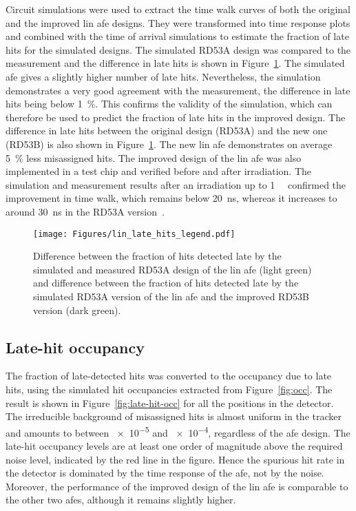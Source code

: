 Circuit simulations were used to extract the time walk curves of both the original and the improved \gls{lin} \gls{afe} designs. They were transformed into time response plots and combined with the time of arrival simulations to estimate the fraction of late hits for the simulated designs.
The simulated RD53A design was compared to the measurement and the difference in late hits is shown in Figure~\ref{fig:meas_vs_sim}. The simulated \gls{afe} gives a slightly higher number of late hits. Nevertheless, the simulation demonstrates a very good agreement with the measurement, the difference in late hits being below \SI{1}{\percent}. This confirms the validity of the simulation, which can therefore be used to predict the fraction of late hits in the improved design. The difference in late hits between the original design (RD53A) and the new one (RD53B) is also shown in Figure~\ref{fig:meas_vs_sim}. The new \gls{lin} \gls{afe} demonstrates on average \SI{5}{\percent} less misassigned hits. 
The improved design of the \gls{lin} \gls{afe} was also implemented in a test chip and verified before and after irradiation. The simulation and measurement results after an irradiation up to \SI{1}{\giga\rad} confirmed the improvement in time walk, which remains below \SI{20}{\nano\second}, whereas it increases to around \SI{30}{\nano\second} in the RD53A version~\citep{new_lin}.

\begin{figure}[t]
    \centering
    \texttt{[image: Figures/lin\_late\_hits\_legend.pdf]}
    \caption{Difference between the fraction of hits detected late by the simulated and measured RD53A design of the \gls{lin} \gls{afe} (light green) and difference between the fraction of hits detected late by the simulated RD53A version of the \gls{lin} \gls{afe} and the improved RD53B version (dark green). }
    \label{fig:meas_vs_sim}
\end{figure}

\subsection*{Late-hit occupancy}

The fraction of late-detected hits was converted to the occupancy due to late hits, using the simulated hit occupancies extracted from Figure~\ref{fig:occ}. The result is shown in Figure~\ref{fig:late-hit-occ} for all the positions in the detector. The irreducible background of misassigned hits is almost uniform in the tracker and amounts to between \num{e-5} and \num{e-4}, regardless of the \gls{afe} design. The late-hit occupancy levels are at least one order of magnitude above the required noise level, indicated by the red line in the figure. Hence the spurious hit rate in the detector is dominated by the time response of the \gls{afe}, not by the noise.
Moreover, the performance of the improved design of the \gls{lin} \gls{afe} is comparable to the other two \glspl{afe}, although it remains slightly higher. 

